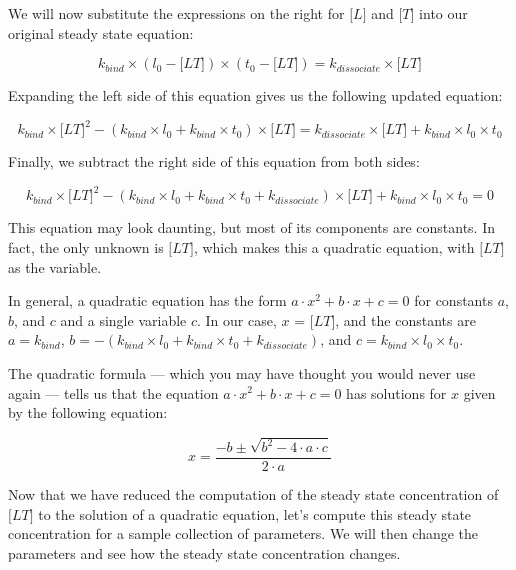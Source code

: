We will now substitute the expressions on the right for $\text{[}L\text{]}$ and $\text{[}T\text{]}$ into our original steady state equation:

$$k_{bind} \times (l_0 - \text{[}LT\text{]}) \times (t_0 - \text{[}LT\text{]}) = k_{dissociate}\times \text{[}LT\text{]}$$

Expanding the left side of this equation gives us the following updated equation:

$$k_{bind} \times \text{[}LT\text{]}^2 - (k_{bind} \times l_0 + k_{bind} \times t_0) \times \text{[}LT\text{]}  = k_{dissociate} \times \text{[}LT\text{]} + k_{bind} \times l_0 \times t_0$$

Finally, we subtract the right side of this equation from both sides:

$$k_{bind} \times \text{[}LT\text{]}^2 - (k_{bind} \times l_0 + k_{bind} \times t_0 + k_{dissociate}) \times \text{[}LT\text{]} + k_{bind} \times l_0 \times t_0 = 0$$

This equation may look daunting, but most of its components are constants. In fact, the only unknown is $\text{[}LT\text{]}$, which makes this a quadratic equation, with $\text{[}LT\text{]}$ as the variable.

In general, a quadratic equation has the form $a \cdot x^2 + b \cdot x + c = 0$ for constants $a$, $b$, and $c$ and a single variable $c$. In our case, $x$ = $\text{[}LT\text{]}$, and the constants are $a = k_{bind}$, $b = - (k_{bind} \times l_0 + k_{bind} \times t_0 + k_{dissociate})$, and $c = k_{bind} \times l_0 \times t_0$.

The quadratic formula --- which you may have thought you would never use again --- tells us that the equation $a \cdot x^2 + b \cdot x + c = 0$  has solutions for $x$ given by the following equation:

$$x = \frac{-b \pm \sqrt{b^2 - 4 \cdot a \cdot c}}{2 \cdot a}$$

\begin{qbox}\end{qbox}

Now that we have reduced the computation of the steady state concentration of $\text{[}LT\text{]}$ to the solution of a quadratic equation, let's compute this steady state concentration for a sample collection of parameters. We will then change the parameters and see how the steady state concentration changes.

